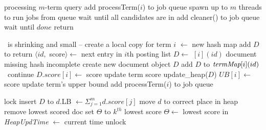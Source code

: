 
\begin{algorithm*}[tbh]
\setlength\multicolsep{0pt}
\small
\begin{multicols}{2}
\begin{algorithmic}[1]
 \Comment processing $m$-term query
\State add {\sc processTerm($i$)} to job queue \label{l:par-init-job}
\EndFor
\State spawn up to $m$  threads to run jobs from queue\label{l:start-threads}
\State wait until \RAStop
	\Comment all candidates  are in \DMap
\State add {\sc cleaner()} to job queue %
\State wait until $done$
\State return \DHeap \label{l:par-end}
%

\Statex 
{} 
	\If{\RAStop\, $\wedge\, |\DMap | < \Phi \, \wedge\  \TMap[i]=\DMap$} \label{l:hash-start}
			\Comment  \DMap\  is shrinking and small -- create a local copy for term $i$
			\State \TMap[i] $\leftarrow$ new hash map
    			 \label{l:hash-chash-loop}
            			\State add $D$ to \TMap[i] \label{l:hash-chash}
            		\EndFor
	\EndIf \label{l:hash-end}
		 return \EndIf
    		\State $\langle id,$ score$\rangle \leftarrow$ next entry in $i$th posting list
		\State $D \leftarrow$ \TMap$[i](id)$
 	  		 \Comment document missing 
 	  			\If{$\neg$\RAStop} \Comment hash incomplete
		 			\State create new document object $D$
 					\State add $D$ to $\textit{termMap}[i](id)$
				\Else\ continue
				\EndIf
    			\EndIf
        			\State $D.score[i] \leftarrow$ score \Comment update term  score
				 {\sc update\_heap}($D$)
			\EndIf	
	\EndFor %
	\State $UB[i] \leftarrow$ score \Comment update term's upper bound \label{l:thread-update-ub}    
	\State add {\sc processTerm($i$)} to job queue \label{l:new-task}
\EndProcedure


\columnbreak

\State lock \DHeap \label{l:lock-heap}
	\State insert $D$ to \DHeap
	  \label{l:for-all-heap-docs}
		\State $d$.LB $\leftarrow \Sigma_{j=1}^{m} d.score[j]$
		\State move $d$ to correct place in heap \label{l:fix-heap}
	\EndFor
		 \State remove lowest scored doc %
	\EndIf
		 \Comment set $\Theta$ to $k^{th}$ lowest score
		\State  $\Theta \leftarrow$ lowest score in \DHeap
	\EndIf
	\State \emph{HeapUpdTime} $\leftarrow$ current time 
\EndIf
\State unlock \DHeap  \label{l:unlock-heap}
\EndProcedure
%
%
 

\end{algorithmic}
\end{multicols}
\end{algorithm*}
